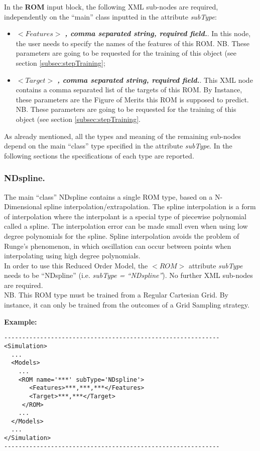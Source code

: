 In the \textbf{ROM} input block, the following XML sub-nodes are required, independently on the ``main'' class inputted in the attribute \textit{subType}:
\begin{itemize}
   \item $<Features>$ \textbf{\textit{, comma separated string, required field.}}. In this node, the user needs to specify the names of the features of this ROM. NB. These parameters are going to be requested for the training of this object (see section \ref{subsec:stepTraining};
    \item $<Target>$ \textbf{\textit{, comma separated string, required field.}}. This XML node contains a comma separated list of the targets of this ROM. By Instance, these parameters are the Figure of Merits this ROM is supposed to predict. NB. These parameters are going to be requested for the training of this object (see section \ref{subsec:stepTraining}.
\end{itemize}
As already mentioned, all the types and meaning of the remaining sub-nodes depend on the main ``class'' type specified in the attribute \textit{subType}. In the following sections the specifications of each type are reported.
\subsubsection{NDspline.}
\label{subsubsec:NDspline}
The main ``class'' NDspline contains a single ROM type, based on a N-Dimensional spline interpolation/extrapolation. The spline interpolation is a form of interpolation where the interpolant is a special type of piecewise polynomial called a spline. The interpolation error can be made small even when using low degree polynomials for the spline. Spline interpolation avoids the problem of Runge's phenomenon, in which oscillation can occur between points when interpolating using high degree polynomials.
\\In order to use this Reduced Order Model, the $<ROM>$ attribute \textit{subType} needs to be ``NDspline'' (i.e. \textit{subType = ``NDspline''}). No further XML sub-nodes are required.
\\NB. This ROM type must be trained from a Regular Cartesian Grid. By instance, it can only be trained from the outcomes of a Grid Sampling strategy. 

\textbf{Example:}
\begin{lstlisting}[style=XML]
------------------------------------------------------------
<Simulation>
  ...
  <Models>
    ...
    <ROM name='***' subType='NDspline'>
       <Features>***,***,***</Features> 
       <Target>***,***</Target>
     </ROM>
    ...
  </Models>
  ...
</Simulation>
------------------------------------------------------------
\end{lstlisting}
